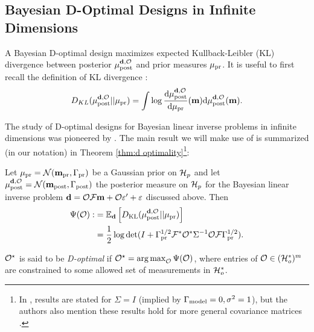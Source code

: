 \subsection{Bayesian D-Optimal Designs in Infinite Dimensions}\label{subsec:D optimal design} 
A Bayesian D-optimal design maximizes expected Kullback-Leibler (KL)
divergence between posterior $\mu_{\textup{post}}^{\mathbf{d}, \mathcal{O}}$ and prior measures $\mu_{\textup{pr}}$. It is
useful to first recall the definition of KL divergence \cite{CoverThomas91}:
$$
D_{KL}(\mu_{\textup{post}}^{\mathbf{d}, \mathcal{O}}||\mu_{\textup{pr}}) = \int \log \frac{\text{\textup{d}} \mu_{\textup{post}}^{\mathbf{d}, \mathcal{O}}}{\text{\textup{d}} \mu_{\textup{pr}}}(\mathbf{m}) \text{\textup{d}} \mu_{\textup{post}}^{\mathbf{d}, \mathcal{O}}(\mathbf{m}).
$$

The study of D-optimal designs for Bayesian linear inverse problems in
infinite dimensions was pioneered by \cite{AlexanderianGloorGhattas14,
  alexanderian2018efficient}. The main result we will make use of is
summarized (in our notation) in Theorem \ref{thm:d optimality}\footnote{In
\cite{AlexanderianGloorGhattas14, alexanderian2018efficient}, results
are stated for $\Sigma=I$ (implied by $\Gamma_{\textup{model}} = 0,\sigma^2=1$), but
the authors also mention these results hold for more general
covariance matrices \cite[p. 681]{AlexanderianGloorGhattas14}.}:


\begin{theorem}\label{thm:d optimality}
  Let $\mu_{\textup{pr}} = \mathcal{N}(\mathbf{m}_{\textup{pr}},\Gamma_{\textup{pr}})$ be a Gaussian prior on $\mathcal{H}_p$
  and let $\mu_{\textup{post}}^{\mathbf{d}, \mathcal{O}} = \mathcal{N}(\mathbf{m}_{\textup{post}},\Gamma_{\textup{post}})$ the posterior measure
  on $\mathcal{H}_p$ for the Bayesian linear inverse problem $\mathbf{d} = \mathcal{O}
  \mathcal{F}\mathbf{m} + \mathcal{O} \varepsilon' + \varepsilon$ discussed above. Then
  \begin{align}\label{eq:objective}
    \begin{split}
      \tar( \obs) :&= \mathbb{E}_{\data}\left [ D_{\text{KL}} (\post || \pr ) \right ] \\
      &= \frac12 \log \det 
      ( I + \prcov^{1/2}  \fwd ^* \obs^* \Sigma^{-1} \obs \fwd \prcov^{1/2}).
    \end{split}
  \end{align}
\end{theorem}
\begin{definition}\label{def:d optimality}
  $\mathcal{O}^{\star}$ is said to be \emph{D-optimal} if $\mathcal{O}^{\star} =
  \operatorname*{arg\,max}_{\mathcal{O}} \Psi(\mathcal{O})$, where entries of $\mathcal{O} \in (\mathcal{H}_o^*)^m$
  are constrained to some allowed set of measurements in $\mathcal{H}_o^*$.
\end{definition}

